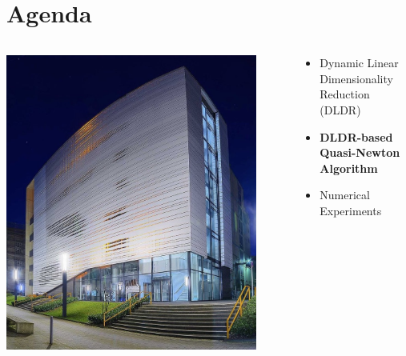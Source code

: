 \documentclass[t]{beamer}
\begin{document}
\section{Agenda}
\begin{frame}
\begin{columns}[c]

\begin{column}{0.5\textwidth}
\begin{center}
\includegraphics[width=0.9\textwidth]{toaster}
\end{center}
\end{column}

\begin{column}{0.5\textwidth}
\begin{itemize}
\item Dynamic Linear Dimensionality Reduction (DLDR) \vspace{1cm}
\item \textbf{DLDR-based Quasi-Newton Algorithm} \vspace{1cm}
\item Numerical Experiments \vspace{1cm} 
\end{itemize}
\end{column}

\end{columns}
\end{frame}
\end{document}
